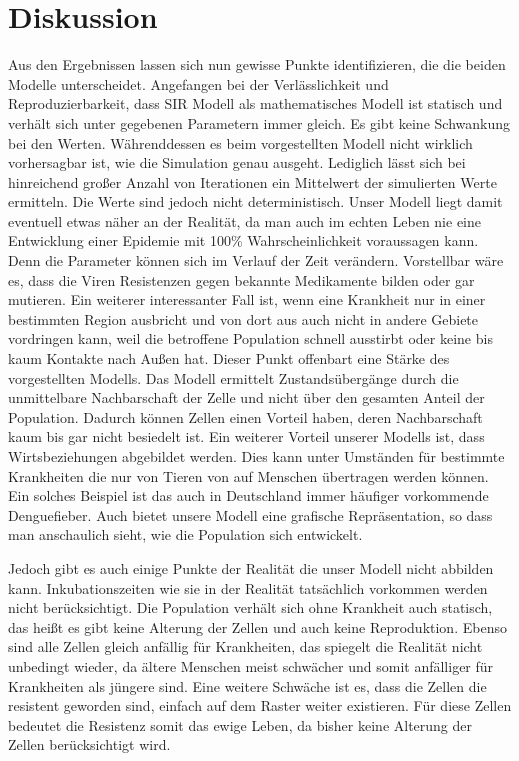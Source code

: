 \documentclass[10pt,twocolumn]{scrartcl}
\begin{document}
\section*{Diskussion}
Aus den Ergebnissen lassen sich nun gewisse Punkte identifizieren, die die beiden Modelle unterscheidet.
Angefangen bei der Verlässlichkeit und Reproduzierbarkeit, dass SIR Modell als mathematisches Modell ist statisch und verhält sich unter gegebenen Parametern immer gleich. Es gibt keine Schwankung bei den Werten. Währenddessen es beim vorgestellten Modell nicht wirklich vorhersagbar ist, wie die Simulation genau ausgeht. Lediglich lässt sich bei hinreichend großer Anzahl von Iterationen ein Mittelwert der simulierten Werte ermitteln. Die Werte sind jedoch nicht deterministisch.
Unser Modell liegt damit eventuell etwas näher an der Realität, da man auch im echten Leben nie eine Entwicklung einer Epidemie mit 100\% Wahrscheinlichkeit voraussagen kann. Denn die Parameter können sich im Verlauf der Zeit verändern. Vorstellbar wäre es, dass die Viren Resistenzen gegen bekannte Medikamente bilden oder gar mutieren.
Ein weiterer interessanter Fall ist, wenn eine Krankheit nur in einer bestimmten Region ausbricht und von dort aus auch nicht in andere Gebiete vordringen kann, weil die betroffene Population schnell ausstirbt oder keine bis kaum Kontakte nach Außen hat. 
Dieser Punkt offenbart eine Stärke des vorgestellten Modells. Das Modell ermittelt Zustandsübergänge durch die unmittelbare Nachbarschaft der Zelle und nicht über den gesamten Anteil der Population.
Dadurch können Zellen einen Vorteil haben, deren Nachbarschaft kaum bis gar nicht besiedelt ist.
Ein weiterer Vorteil unserer Modells ist, dass Wirtsbeziehungen abgebildet werden. Dies kann unter Umständen für bestimmte Krankheiten die nur von Tieren von auf Menschen übertragen werden können. Ein solches Beispiel ist das auch in Deutschland immer häufiger vorkommende Denguefieber.
Auch bietet unsere Modell eine grafische Repräsentation, so dass man anschaulich sieht, wie die Population sich entwickelt.


Jedoch gibt es auch einige Punkte der Realität die unser Modell nicht abbilden kann. Inkubationszeiten wie sie in der Realität tatsächlich vorkommen werden nicht berücksichtigt. Die Population verhält sich ohne Krankheit auch statisch, das heißt es gibt keine Alterung der Zellen und auch keine Reproduktion. Ebenso sind alle Zellen gleich anfällig für Krankheiten, das spiegelt die Realität nicht unbedingt wieder, da ältere Menschen meist schwächer und somit anfälliger für Krankheiten als jüngere sind.
Eine weitere Schwäche ist es, dass die Zellen die resistent geworden sind, einfach auf dem Raster weiter existieren. Für diese Zellen bedeutet die Resistenz somit das ewige Leben, da bisher keine Alterung der Zellen berücksichtigt wird. 
\end{document}
